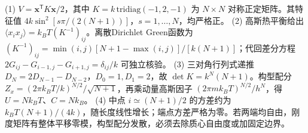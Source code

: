 (1) \(V=\mathbf x^{\mathsf T}K\mathbf x/2\)，其中 \(K=k\,\mathrm{tridiag}(-1,2,-1)\) 为 \(N\times N\) 对称正定矩阵。其特征值 \(4k\sin^2[s\pi/(2(N+1))]\)，\(s=1,\ldots,N\)，均严格正。
(2) 高斯热平衡给出 \(\langle x_i x_j\rangle=k_BT(K^{-1})_{ij}\)。离散Dirichlet Green函数为 \((K^{-1})_{ij}=\min(i,j)[N+1-\max(i,j)]/[k(N+1)]\)；代回差分方程 \(2G_{ij}-G_{i-1,j}-G_{i+1,j}=\delta_{ij}/k\) 可独立核验。
(3) 三对角行列式递推 \(D_N=2D_{N-1}-D_{N-2}\)，\(D_0=1,D_1=2\)，故 \(\det K=k^N(N+1)\)。构型配分 \(Z_x=(2\pi k_BT/k)^{N/2}/\sqrt{N+1}\)，再乘动量高斯因子 \((2\pi mk_BT)^{N/2}/h^N\)，得 \(U=Nk_BT\)、\(C=Nk_B\)。
(4) 中点 \(i\simeq(N+1)/2\) 的方差约为 \(k_BT(N+1)/(4k)\)，随长度线性增长；端点方差严格为零。若两端均自由，刚度矩阵有整体平移零模，构型配分发散，必须去除质心自由度或加固定边界。
